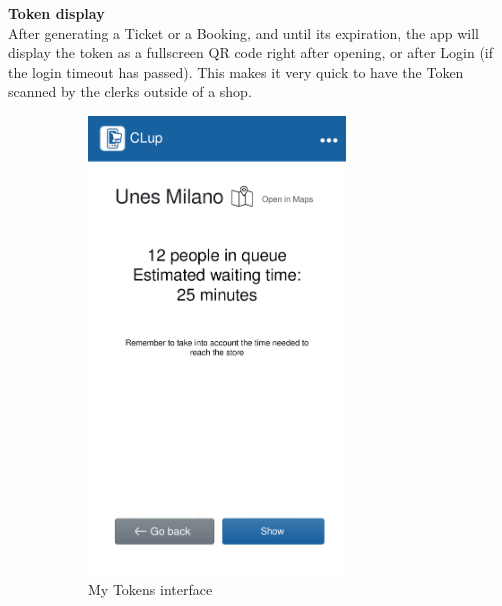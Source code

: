\textbf{Token display}\\
\label{page:token_show}
After generating a Ticket or a Booking, and until its expiration, the app will display the token as a fullscreen QR code right after opening, or after Login (if the login timeout has passed).
This makes it very quick to have the Token scanned by the clerks outside of a shop.
\begin{figure}[H]
    \begin{subfigure}{0.5\textwidth}
        \centering
        \includegraphics[width=0.75\textwidth]{Images/queue-mockup.png}
        \caption{My Tokens interface}
    \end{subfigure}%
    \begin{subfigure}{0.5\textwidth}
        \centering

\end{subfigure}
\end{figure}
